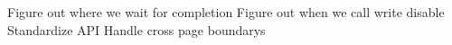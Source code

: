 
\begin{DoxyRefList}
\item[Member \mbox{\hyperlink{classS25FL512_a81aac4f7bc78c0336b0b2e3a4dcb0519}{S25\+FL512\+::S25\+FL512}} (uint8\+\_\+t chip\+Select\+Pin)]\label{todo__todo000002}%
%
 Figure out where we wait for completion Figure out when we call write disable Standardize API Handle cross page boundary\textquotesingle{}s 
\end{DoxyRefList}